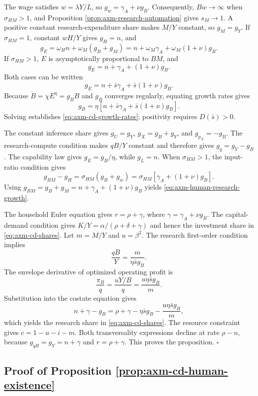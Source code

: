 The wage satisfies \(w=\lambda Y/L\), so
\(g_w=\gamma_A+\nu g_B\). Consequently, \(Bw\to\infty\) when
\(\sigma_{HM}>1\), and Proposition \ref{prop:axm-research-automation} gives
\(s_M\to1\). A positive constant research-expenditure share makes \(M/Y\)
constant, so \(g_M=g_Y\). If \(\sigma_{HM}=1\), constant \(wH/Y\) gives
\(g_H=n\), and
\[
 g_E=\omega_Hn+\omega_M(g_B+g_M)
 =n+\omega_M\gamma_A+\omega_M(1+\nu)g_B.
\]
If \(\sigma_{HM}>1\), \(E\) is asymptotically proportional to \(BM\), and
\[
 g_E=n+\gamma_A+(1+\nu)g_B.
\]
Both cases can be written
\[
 g_E=n+\bar s\gamma_A+\bar s(1+\nu)g_B.
\]
Because \(\dot B=\chi E^\eta=g_BB\) and \(g_B\) converges regularly,
equating growth rates gives
\[
 g_B=\eta[n+\bar s\gamma_A+\bar s(1+\nu)g_B].
\]
Solving establishes \eqref{eq:axm-cd-growth-rates}; positivity requires
\(D(\bar s)>0\).

The constant inference share gives \(g_U=g_Y\), \(g_X=g_B+g_Y\), and
\(g_{p_X}=-g_B\). The research-compute condition makes \(qB/Y\) constant and
therefore gives \(g_q=g_Y-g_B\). The capability law gives
\(g_E=g_B/\eta\), while \(g_L=n\). When \(\sigma_{HM}>1\), the input-ratio
condition gives
\[
 g_{BM}-g_H=\sigma_{HM}(g_B+g_w)
 =\sigma_{HM}[\gamma_A+(1+\nu)g_B].
\]
Using \(g_{BM}=g_B+g_M=n+\gamma_A+(1+\nu)g_B\) yields
\eqref{eq:axm-human-research-growth}.

The household Euler equation gives \(r=\rho+\gamma\), where
\(\gamma=\gamma_A+\nu g_B\). The capital-demand condition gives
\(K/Y=\alpha/(\rho+\delta+\gamma)\) and hence the investment share in
\eqref{eq:axm-cd-shares}. Let \(m=M/Y\) and \(u=\beta^2\). The research
first-order condition implies
\[
 \frac{qB}{Y}=\frac{m}{\eta\bar s g_B}.
\]
The envelope derivative of optimized operating profit is
\[
 \frac{\pi_B}{q}=\frac{uY/B}{q}
 =\frac{u\eta\bar s g_B}{m}.
\]
Substitution into the costate equation gives
\[
 n+\gamma-g_B
 =\rho+\gamma-\eta\bar s g_B
 -\frac{u\eta\bar s g_B}{m},
\]
which yields the research share in \eqref{eq:axm-cd-shares}. The resource
constraint gives \(c=1-u-i-m\). Both transversality expressions decline at
rate \(\rho-n\), because \(g_{qB}=g_Y=n+\gamma\) and
\(r=\rho+\gamma\). This proves the proposition. \(\square\)

\subsection{Proof of Proposition \ref{prop:axm-cd-human-existence}}


